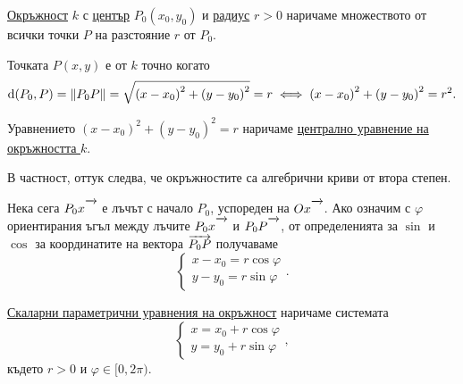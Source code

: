 \documentclass[numbers=endperiod, DIV=15]{scrartcl}
\begin{document}
\begin{definition}
  \underline{Окръжност} $k$ с \underline{център} $P_0(x_0, y_0)$ и \underline{радиус} $r > 0$ наричаме множеството от всички точки $P$ на разстояние $r$ от $P_0$.

  Точката $P(x, y)$ е от $k$ точно когато
  \begin{displaymath}
    \operatorname{d}(P_0, P)
    =
    \left\Vert P_0 P \right\Vert
    =
    \sqrt{{(x - x_0)}^2 + {(y - y_0)}^2} = r
    \iff
    {(x - x_0)}^2 + {(y - y_0)}^2 = r^2.
  \end{displaymath}

  Уравнението ${(x - x_0)}^2 + {(y - y_0)}^2 = r$ наричаме \underline{централно уравнение на окръжността $k$}.

  В частност, оттук следва, че окръжностите са алгебрични криви от втора степен.

  \bigskip
  \begin{minipage}{0.5\textwidth}
    Нека сега $P_0 x\Ray$ е лъчът с начало $P_0$, успореден на $Ox\Ray$. Ако означим с $\varphi$ ориентирания ъгъл между лъчите $P_0x\Ray$ и $P_0 P\Ray$, от определенията за $\sin$ и $\cos$ за координатите на вектора $\overrightarrow{P_0 P}$ получаваме
    \begin{displaymath}
      \begin{cases}
        x - x_0 = r \cos \varphi \\
        y - y_0 = r \sin \varphi
      \end{cases}.
    \end{displaymath}

    \underline{Скаларни параметрични уравнения на окръжност} наричаме системата
    \begin{displaymath}
      \begin{cases}
        x = x_0 + r \cos \varphi \\
        y = y_0 + r \sin \varphi
      \end{cases},
    \end{displaymath}
    където $r > 0$ и $\varphi \in [0, 2\pi)$.
  \end{minipage}
  \begin{minipage}{0.5\textwidth}
    \begin{figure}[H]
      \begin{center}
\end{center}
\end{figure}
\end{minipage}
\end{definition}
\end{document}
